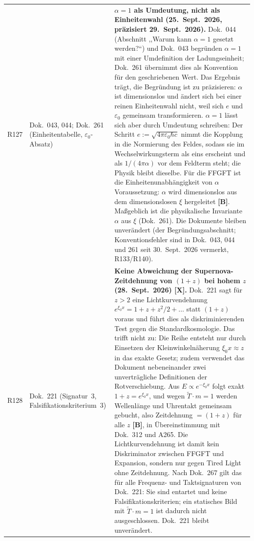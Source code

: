 \begin{longtable}{@{}p{0.9cm}p{3.1cm}p{10.2cm}@{}}
R127 & Dok.~043, 044; Dok.~261 (Einheitentabelle, $\varepsilon_0$-Absatz) & \textbf{$\alpha=1$ als Umdeutung, nicht als Einheitenwahl (25.~Sept.~2026, präzisiert 29.~Sept.~2026).} Dok.~044 (Abschnitt ,,Warum kann $\alpha=1$ gesetzt werden?``) und Dok.~043 begründen $\alpha=1$ mit einer Umdefinition der Ladungseinheit; Dok.~261 übernimmt dies als Konvention für den geschriebenen Wert. Das Ergebnis trägt, die Begründung ist zu präzisieren: $\alpha$ ist dimensionslos und ändert sich bei einer reinen Einheitenwahl nicht, weil sich $e$ und $\varepsilon_0$ gemeinsam transformieren. $\alpha=1$ lässt sich aber durch Umdeutung schreiben: Der Schritt $e:=\sqrt{4\pi\varepsilon_0\hbar c}$ nimmt die Kopplung in die Normierung des Feldes, sodass sie im Wechselwirkungsterm als eins erscheint und als $1/(4\pi\alpha)$ vor dem Feldterm steht; die Physik bleibt dieselbe. Für die FFGFT ist die Einheitenunabhängigkeit von $\alpha$ Voraussetzung: $\alpha$ wird dimensionslos aus dem dimensionslosen $\xi$ hergeleitet \textbf{[B]}. Maßgeblich ist die physikalische Invariante $\alpha$ aus $\xi$ (Dok.~261). Die Dokumente bleiben unverändert (der Begründungsabschnitt; Konventionsfehler sind in Dok.~043, 044 und 261 seit 30.~Sept.~2026 vermerkt, R133/R140). \\
R128 & Dok.~221 (Signatur~3, Falsifikationskriterium~3) & \textbf{Keine Abweichung der Supernova-Zeitdehnung von $(1+z)$ bei hohem $z$ (28.~Sept.~2026) [X].} Dok.~221 sagt für $z>2$ eine Lichtkurvendehnung $e^{\xi_0 x}=1+z+z^2/2+\ldots$ statt $(1+z)$ voraus und führt dies als diskriminierenden Test gegen die Standardkosmologie. Das trifft nicht zu: Die Reihe entsteht nur durch Einsetzen der Kleinwinkelnäherung $\xi_0 x\approx z$ in das exakte Gesetz; zudem verwendet das Dokument nebeneinander zwei unverträgliche Definitionen der Rotverschiebung. Aus $E\propto e^{-\xi_0 x}$ folgt exakt $1+z=e^{\xi_0 x}$, und wegen $\tilde T\cdot m=1$ werden Wellenlänge und Uhrentakt gemeinsam gebucht, also Zeitdehnung $=(1+z)$ für alle $z$ \textbf{[B]}, in Übereinstimmung mit Dok.~312 und A265. Die Lichtkurvendehnung ist damit kein Diskriminator zwischen FFGFT und Expansion, sondern nur gegen Tired Light ohne Zeitdehnung. Nach Dok.~267 gilt das für alle Frequenz- und Taktsignaturen von Dok.~221: Sie sind entartet und keine Falsifikationskriterien; ein statisches Bild mit $\tilde T\cdot m=1$ ist dadurch nicht ausgeschlossen. Dok.~221 bleibt unverändert. \\

\end{longtable}

